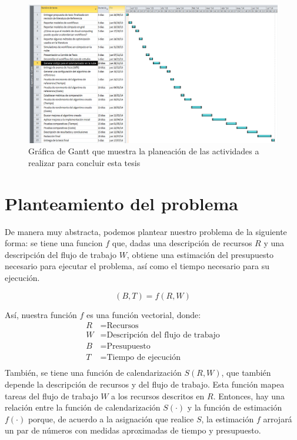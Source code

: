 \documentclass[letterpaper, 12pt]{report}
\begin{document}
\begin{figure}[!H]
    \begin{center}
        \includegraphics[scale=0.7,angle=90]{imagenes/gantt}
    \end{center}
    \caption{Gráfica de Gantt que muestra la planeación de las actividades a realizar para concluir esta tesis}
    \label{fig:gantt}
\end{figure}

\chapter*{Planteamiento del problema}
De manera muy abstracta, podemos plantear nuestro problema de la siguiente forma: se tiene una funcion $f$ que, dadas una descripción de recursos $R$ y una descripción del flujo de trabajo $W$, obtiene una estimación del presupuesto necesario para ejecutar el problema, así como el tiempo necesario para su ejecución. 

\begin{equation}
(B, T) = f(R, W)
\end{equation}

Así, nuestra función $f$ es una función vectorial, donde:
\begin{align*}
R &= \text{Recursos} \\
W  &= \text{Descripción del flujo de trabajo} \\
B &= \text{Presupuesto} \\
T &= \text{Tiempo de ejecución} \\
\end{align*}
También, se tiene una función de calendarización $S(R, W)$, que también depende la descripción de recursos y del flujo de trabajo. Esta función mapea tareas del flujo de trabajo $W$ a los recursos descritos en $R$. Entonces, hay una relación entre la función de calendarización $S( \cdot )$ y la función de estimación $f( \cdot )$ porque, de acuerdo a la asignación que realice $S$, la estimación $f$ arrojará un par de números con medidas aproximadas de tiempo y presupuesto.
\end{document}
